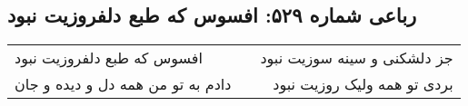\begin{center}
\section*{رباعی شماره ۵۲۹: افسوس که طبع دلفروزیت نبود}
\label{sec:0529}
\begin{longtable}{l p{0.5cm} r}
افسوس که طبع دلفروزیت نبود
&&
جز دلشکنی و سینه سوزیت نبود
\\
دادم به تو من همه دل و دیده و جان
&&
بردی تو همه ولیک روزیت نبود
\\
\end{longtable}
\end{center}
